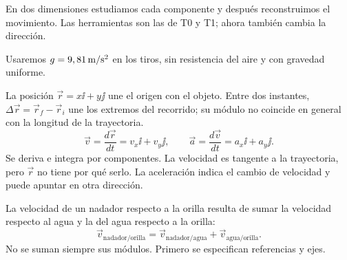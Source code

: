 \documentclass[11pt,a4paper]{article}
\begin{document}
\shorthandoff{<>}
\color{Ink}
En dos dimensiones estudiamos cada componente y despu\'es reconstruimos el
movimiento. Las herramientas son las de T0 y T1; ahora tambi\'en cambia la direcci\'on.
\begin{lessonindex}
\end{lessonindex}
Usaremos $g=9,81\,\mathrm{m/s^2}$ en los tiros, sin resistencia del aire y con gravedad uniforme.
\precisionnote

La posici\'on $\vec r=x\ii+y\jj$ une el origen con el objeto.
Entre dos instantes, $\Delta\vec r=\vec r_f-\vec r_i$ une los extremos del recorrido;
su m\'odulo no coincide en general con la longitud de la trayectoria.
\[
\vec v=\frac{d\vec r}{dt}=v_x\ii+v_y\jj,\qquad
\vec a=\frac{d\vec v}{dt}=a_x\ii+a_y\jj.
\]
Se deriva e integra por componentes. La velocidad es tangente a la trayectoria,
pero $\vec r$ no tiene por qu\'e serlo. La aceleraci\'on indica el cambio de
velocidad y puede apuntar en otra direcci\'on.

La velocidad de un nadador respecto a la orilla resulta de sumar la velocidad
respecto al agua y la del agua respecto a la orilla:
\[
\vec v_{\mathrm{nadador/orilla}}
=\vec v_{\mathrm{nadador/agua}}+\vec v_{\mathrm{agua/orilla}}.
\]
No se suman siempre sus m\'odulos. Primero se especifican referencias y ejes.
\end{document}
